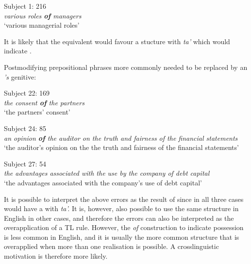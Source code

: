 \documentclass[output=paper]{langsci/langscibook}
\begin{document}
\begin{exe}  
  \ex{}
  {Subject 1: 216}\\
    \textit{various roles \textbf{of} managers}\\
    {‘various managerial roles’}
  \label{ex28}
\end{exe}

It is likely that the  equivalent would favour a stucture with
\textit{ta’} which would indicate .



Postmodifying prepositional phrases more commonly needed to be
replaced by an \textit{’s} genitive:


\begin{exe}  
  \ex{}
  {Subject 22: 169}\\
    \textit{the consent \textbf{of} the partners}\\
    {‘the partners’ consent’}
  \label{ex29}
\end{exe}


\begin{exe}  
  \ex{}
  {Subject 24: 85}\\
    \textit{an opinion \textbf{of} the auditor on the truth and fairness of the financial statements}\\
    {‘the auditor’s opinion on the the truth and fairness of the financial statements’}
  \label{ex30}
\end{exe}


\begin{exe}  
  \ex{}
  {Subject 27: 54}\\
    \textit{the advantages associated with the use \textit{by} the company of debt capital}\\
    {‘the advantages associated with the company’s use of debt capital’}
  \label{ex31}
\end{exe}

It is possible to interpret the above errors as the result of  since in all three cases  would have a   with \textit{ta’.} It is, however, also possible to use the same structure in English in other cases, and therefore the errors can also be interpreted as the overapplication of a TL rule. 
However, the \textit{of} construction to indicate possession is less common in English, and it is usually the more common structure that is overapplied when more than one realisation is possible. A crosslinguistic motivation is therefore more likely.
\end{document}
